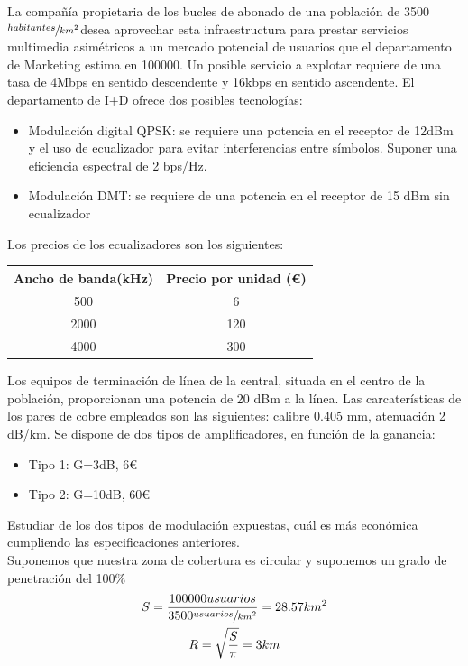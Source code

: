 \begin{exercise}[3]
	La compañía propietaria de los bucles de abonado de una población de 3500$\sfrac{habitantes}{km^2}$desea aprovechar esta infraestructura para prestar servicios multimedia asimétricos a un mercado potencial de usuarios que el departamento de Marketing estima en 100000. Un posible servicio a explotar requiere de una tasa de 4Mbps en sentido descendente y 16kbps en sentido ascendente. El departamento de I+D ofrece dos posibles tecnologías:
	\begin{itemize}
		\item Modulación digital QPSK: se requiere una potencia en el receptor de 12dBm y el uso de ecualizador para evitar interferencias entre símbolos. Suponer una eficiencia espectral de 2 bps/Hz.
		\item Modulación DMT: se requiere de una potencia en el receptor de 15 dBm sin ecualizador
	\end{itemize}
	Los precios de los ecualizadores son los siguientes:
	\begin{center}
	\begin{tabular}{|c c|}
	\hline
		Ancho de banda(kHz) & Precio por unidad (€)\\\hline
		500 & 6\\\hline
		2000 & 120\\\hline
		4000 & 300\\\hline
	\end{tabular}
	\end{center}
	Los equipos de terminación de línea de la central, situada en el centro de la población, proporcionan una potencia de 20 dBm a la línea. Las carcaterísticas de los pares de cobre empleados son las siguientes: calibre 0.405 mm, atenuación 2 dB/km. Se dispone de dos tipos de amplificadores, en función de la ganancia:
	\begin{itemize}
		\item Tipo 1: G=3dB, 6€
		\item Tipo 2: G=10dB, 60€
	\end{itemize}
	Estudiar de los dos tipos de modulación expuestas, cuál es más económica cumpliendo las especificaciones anteriores.\\
	Suponemos que nuestra zona de cobertura es circular y suponemos un grado de penetración del 100\%
	\begin{gather*}
		S=\frac{100000usuarios}{3500\sfrac{usuarios}{km^2}}=28.57km^2\\
		R=\sqrt{\frac{S}{\pi}}=3km\\

\end{gather*}
\end{exercise}
